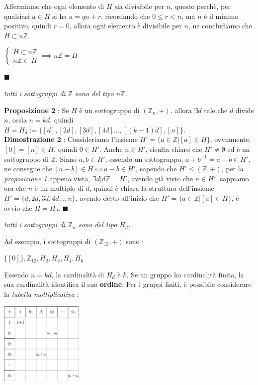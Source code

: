 \documentclass[12pt, letterpaper]{article}
\begin{document}
Affermiamo che ogni elemento di \(H\)
sia divisibile per \(n\), questo perchè, per qualsiasi \(a\in H\) si ha \(a=qn+r\), ricordando che 
\(0\le r< n\), ma \(n\) è il minimo positivo, quindi \(r=0\), allora ogni elemento è divisibile 
per \(n\), ne concludiamo che \(H\subset n\mathbb{Z}\).
\begin{center}
    \(
      \begin{cases}
        H\subset n\mathbb{Z}\\n\mathbb{Z}\subset H
      \end{cases}  \implies n\mathbb{Z} = H
    \) 
\end{center}\raggedleft \(\blacksquare\)
\begin{center}
    \textit{tutti i sottogruppi di \(\mathbb{Z}\) sono del tipo \(n\mathbb{Z}\).}
\end{center}\raggedright
\textbf{Proposizione 2 } : Se \(H\) è un sottogruppo di \((\mathbb{Z}_n,+)\), allora \(\exists d \) tale che 
\(d\) divide \(n\), ossia \(n=kd\), quindi \(H=H_d := \{[d],[2d],[3d],[4d]...,[(k-1)d],[n]\}  \).
\\\textbf{Dimostrazione 2 } : Consideriamo l'insieme \(H'=\{a\in \mathbb{Z}|[a]\in H\}\), ovviamente, 
\([0]=[n]\in H\), quindi \(0\in H'\). Anche \(n\in H'\), risulta chiaro che \(H'\ne \emptyset\) ed è un 
sottogruppo di \(\mathbb{Z}\). Siano \(a,b\in H'\), essendo un sottogruppo, \(a+b^{-1}=a-b\in H'\), 
ne consegue che \([a-b]\in H\iff a-b\in H'\), sapendo che \(H'\le (\mathbb{Z},+)\), per la 
\textit{proposizione 1} appena vista, \(\exists d | d\mathbb{Z}=H'\), avendo già visto che \(n\in H'\), sappiamo 
ora che \(n\) è un multiplo di \(d\), quindi è chiara la struttura dell'insieme \(H'=\{d,2d,3d,4d...,n\}\), avendo 
detto all'inizio che \(H'=\{a\in \mathbb{Z}|[a]\in H\}\), è ovvio che \(H=H_d\). \(\blacksquare\) 
\begin{center}
    \textit{tutti i sottogruppi di \(\mathbb{Z}_n\) sono del tipo \(H_d\).}
\end{center}
Ad esempio, i sottogruppi di \((\mathbb{Z}_{12},+)\) sono :\begin{center}
    \(\{[0]\},\mathbb{Z}_{12},H_2,H_3,H_4,H_6
        \)
\end{center}
Essendo \(n=kd\), la cardinalità di \(H_d\) è \(k\). Se un gruppo ha cardinalità finita, la sua cardinalità 
identifica il suo \textbf{ordine}. Per i gruppi finiti, è possibile considerare la \textit{tabella moltiplicativa} :\begin{center}
    \includegraphics[width=0.3\textwidth ]{images/TabellaMoltiplicativa.eps}
\end{center}
\end{document}
